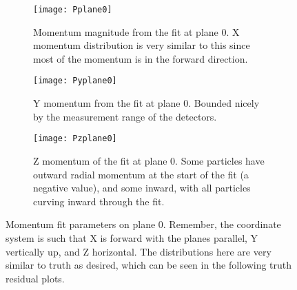 \begin{figure}
    \centering
    \begin{subfigure}[]{0.6\textwidth}
        \centering
        \texttt{[image: Pplane0]} 
        \caption{Momentum magnitude from the fit at plane 0. X momentum distribution is very similar to this since most of the momentum is in the forward direction.}
    \end{subfigure}

    \begin{subfigure}[]{0.6\textwidth}
        \centering
        \texttt{[image: Pyplane0]} 
        \caption{Y momentum from the fit at plane 0. Bounded nicely by the measurement range of the detectors.}
    \end{subfigure}
    
    \begin{subfigure}[]{0.6\textwidth}
        \centering
        \texttt{[image: Pzplane0]} 
        \caption{Z momentum of the fit at plane 0. Some particles have outward radial momentum at the start of the fit (a negative value), and some inward, with all particles curving inward through the fit.}
    \end{subfigure}

    \caption{Momentum fit parameters on plane 0. Remember, the coordinate system is such that X is forward with the planes parallel, Y vertically up, and Z horizontal. The distributions here are very similar to truth as desired, which can be seen in the following truth residual plots.}
\end{figure}


